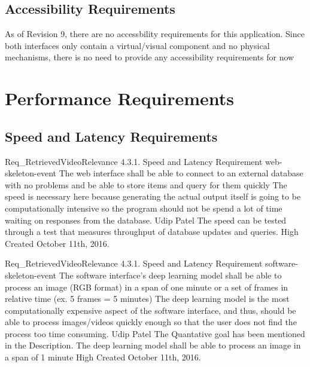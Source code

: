 \documentclass{scrreprt}
\begin{document}
\subsection{Accessibility Requirements}

As of Revision 9, there are no accessbility requirements for this application.
Since both interfaces only contain a virtual/visual component and no physical
mechanisms, there is no need to provide any accessibility requirements for now

\section{Performance Requirements}

\subsection{Speed and Latency Requirements}
\label{req-speed-latency}

\requirement
{Req_RetrievedVideoRelevance}
{4.3.1. Speed and Latency Requirement}
{web-skeleton-event}
{The web interface shall be able to connect to an external database with no problems and be able to store items and query for them quickly }
{The speed is necessary here because generating the actual output itself is going to be computationally intensive so the program should not be spend a lot of time waiting on responses from the database.}
{Udip Patel}
{The speed can be tested through a test that measures throughput of database updates and queries.}
{High}
{Created October 11th, 2016.}

\requirement
{Req_RetrievedVideoRelevance}
{4.3.1. Speed and Latency Requirement}
{software-skeleton-event}
{The software interface's deep learning model shall be able to process an image (RGB format) in a span of one minute or a set of frames in relative time (ex. 5 frames = 5 minutes)}
{The deep learning model is the most computationally expensive aspect of the software interface, and thus, should be able to process images/videos quickly enough so that the user does not find the process too time consuming.}
{Udip Patel}
{The Quantative goal has been mentioned in the Description. The deep learning model shall be able to process an image in a span of 1 minute}
{High}
{Created October 11th, 2016.}
\end{document}
